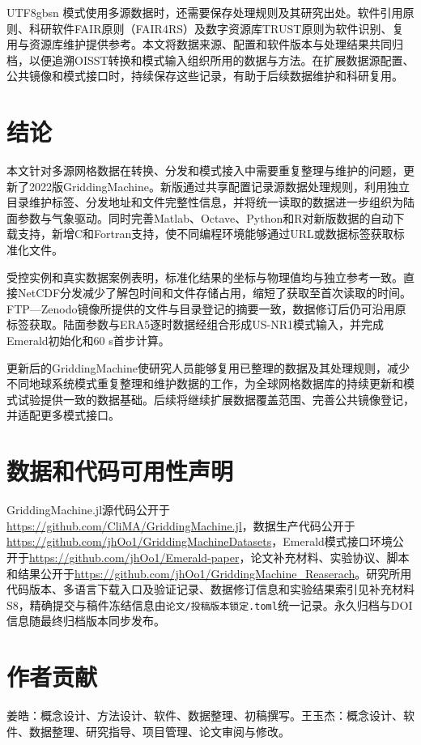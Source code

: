 \documentclass[numdoi]{chinese}
\begin{document}
\begin{CJK}{UTF8}{gbsn}
模式使用多源数据时，还需要保存处理规则及其研究出处。软件引用原则、科研软件FAIR原则（FAIR4RS）及数字资源库TRUST原则为软件识别、复用与资源库维护提供参考\cite{ref20,ref21,ref22}。本文将数据来源、配置和软件版本与处理结果共同归档，以便追溯OISST转换和模式输入组织所用的数据与方法。在扩展数据源配置、公共镜像和模式接口时，持续保存这些记录，有助于后续数据维护和科研复用。

\section{结论}
本文针对多源网格数据在转换、分发和模式接入中需要重复整理与维护的问题，更新了2022版GriddingMachine。新版通过共享配置记录源数据处理规则，利用独立目录维护标签、分发地址和文件完整性信息，并将统一读取的数据进一步组织为陆面参数与气象驱动。同时完善Matlab、Octave、Python和R对新版数据的自动下载支持，新增C和Fortran支持，使不同编程环境能够通过URL或数据标签获取标准化文件。

受控实例和真实数据案例表明，标准化结果的坐标与物理值均与独立参考一致。直接NetCDF分发减少了解包时间和文件存储占用，缩短了获取至首次读取的时间。FTP—Zenodo镜像所提供的文件与目录登记的摘要一致，数据修订后仍可沿用原标签获取。陆面参数与ERA5逐时数据经组合形成US-NR1模式输入，并完成Emerald初始化和60 s首步计算。

更新后的GriddingMachine使研究人员能够复用已整理的数据及其处理规则，减少不同地球系统模式重复整理和维护数据的工作，为全球网格数据库的持续更新和模式试验提供一致的数据基础。后续将继续扩展数据覆盖范围、完善公共镜像登记，并适配更多模式接口。

\section*{数据和代码可用性声明}
GriddingMachine.jl源代码公开于\url{https://github.com/CliMA/GriddingMachine.jl}，数据生产代码公开于\url{https://github.com/jhOo1/GriddingMachineDatasets}，Emerald模式接口环境公开于\url{https://github.com/jhOo1/Emerald-paper}，论文补充材料、实验协议、脚本和结果公开于\url{https://github.com/jhOo1/GriddingMachine_Reaserach}。研究所用代码版本、多语言下载入口及验证记录、数据修订信息和实验结果索引见补充材料S8，精确提交与稿件冻结信息由\texttt{论文/投稿版本锁定.toml}统一记录。永久归档与DOI信息随最终归档版本同步发布。

\section*{作者贡献}
姜皓：概念设计、方法设计、软件、数据整理、初稿撰写。王玉杰：概念设计、软件、数据整理、研究指导、项目管理、论文审阅与修改。


\end{CJK}
\end{document}
